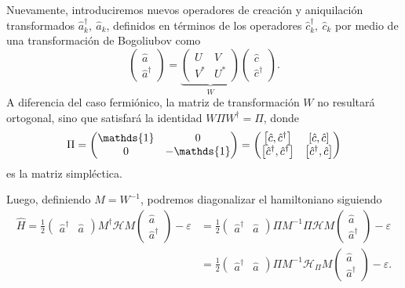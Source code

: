 \documentclass{scrartcl}
\newcommand{\inv}[1]{\frac{1}{#1}}
\renewcommand{\a}{\hat{a}}
\renewcommand{\c}{\hat{c}}
\DeclareRobustCommand{\[}{\begin{equation}}
\DeclareRobustCommand{\]}{\end{equation}}
\begin{document}
\begin{enumerate}
\begin{enumerate}
\begin{enumerate}[(i)]
            Nuevamente, introduciremos nuevos operadores de creación y aniquilación transformados $\a_k^\dagger, \ \a_k$, definidos en términos de los operadores $\c_k^\dagger, \ \c_k$ por medio de una transformación de Bogoliubov como
            \[ \begin{pmatrix} \a \\ \a^\dagger \end{pmatrix} = \underbrace{\begin{pmatrix} U & V \\ V^* & U^* \end{pmatrix}}_{W} \begin{pmatrix} \c \\ \c^\dagger \end{pmatrix}. \]
            A diferencia del caso fermiónico, la matriz de transformación $W$ no resultará ortogonal, sino que satisfará la identidad $W \Pi W^\dagger = \Pi$, donde
            \[ \Pi = \begin{pmatrix} \mathds{1} & 0 \\ 0 & -\mathds{1} \end{pmatrix} = \begin{pmatrix} \comm{\c}{\c^\dagger} & \comm{\c}{\c} \\ \comm{\c^\dagger}{\c^\dagger} & \comm{\c^\dagger}{\c} \end{pmatrix} \]
            es la matriz simpléctica.
            
            Luego, definiendo $M = W^{-1}$, podremos diagonalizar el hamiltoniano siguiendo
            \begin{align}
                \hat H = \inv{2} \begin{pmatrix} \a^\dagger & \a \end{pmatrix} M^\dagger \mathcal{H} M \begin{pmatrix} \a \\ \a^\dagger \end{pmatrix} - \varepsilon &= \inv{2} \begin{pmatrix} \a^\dagger & \a \end{pmatrix} \Pi M^{-1} \Pi \mathcal{H} M \begin{pmatrix} \a \\ \a^\dagger \end{pmatrix} - \varepsilon \\
                    &= \inv{2} \begin{pmatrix} \a^\dagger & \a \end{pmatrix} \Pi M^{-1} \mathcal{H}_\Pi M \begin{pmatrix} \a \\ \a^\dagger \end{pmatrix} - \varepsilon.
            \end{align}
            

\end{enumerate}
\end{enumerate}
\end{enumerate}
\end{document}
